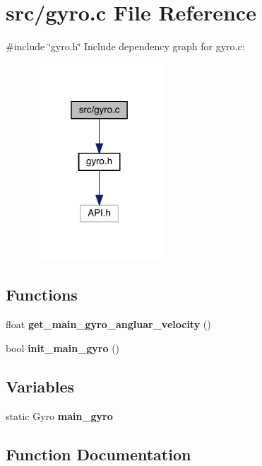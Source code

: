 \section{src/gyro.c File Reference}
\label{gyro_8c}
{\ttfamily \#include \char`\"{}gyro.\+h\char`\"{}}\newline
Include dependency graph for gyro.\+c\+:
\nopagebreak
\begin{figure}[H]
\begin{center}
\leavevmode
\includegraphics[width=139pt]{gyro_8c__incl}
\end{center}
\end{figure}
\subsection*{Functions}
\begin{DoxyCompactItemize}
\item 
float \textbf{ get\+\_\+main\+\_\+gyro\+\_\+angluar\+\_\+velocity} ()
\item 
bool \textbf{ init\+\_\+main\+\_\+gyro} ()
\end{DoxyCompactItemize}
\subsection*{Variables}
\begin{DoxyCompactItemize}
\item 
static Gyro \textbf{ main\+\_\+gyro}
\end{DoxyCompactItemize}


\subsection{Function Documentation}
\mbox{\label{gyro_8c_aec0963ebe3eb6cdfd7edaf486bbb0a87}} 
